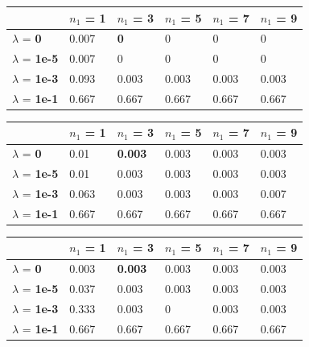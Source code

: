\documentclass[10pt]{article}
\begin{document}
\begin{table}
\centering
\begin{tabular}{llllll}
\toprule
& $n_1$ = \bf{1} & $n_1$ =  \bf{3} & $n_1$ =  \bf{5} & $n_1$ =  \bf{7} & $n_1$ =  \bf{9} \\
\midrule
$\lambda$ = \bf{0} &  0.007 & \bf{0}     & 0     & 0     & 0     \\
$\lambda$ = \bf{1e-5} & 0.007 & 0     & 0     & 0     & 0     \\
$\lambda$ = \bf{1e-3} & 0.093 & 0.003 & 0.003 & 0.003 & 0.003 \\
$\lambda$ = \bf{1e-1} & 0.667 & 0.667 & 0.667 & 0.667 & 0.667 \\
\bottomrule
\end{tabular}
\end{table}

\begin{table}
\centering
\begin{tabular}{llllll}
\toprule
& $n_1$ = \bf{1} & $n_1$ =  \bf{3} & $n_1$ =  \bf{5} & $n_1$ =  \bf{7} & $n_1$ =  \bf{9} \\
\midrule
$\lambda$ = \bf{0} &      0.01  & \bf{0.003} & 0.003 & 0.003 & 0.003 \\
$\lambda$ = \bf{1e-5} &  0.01  & 0.003 & 0.003 & 0.003 & 0.003 \\
$\lambda$ = \bf{1e-3} &  0.063 & 0.003 & 0.003 & 0.003 & 0.007 \\
$\lambda$ = \bf{1e-1} &  0.667 & 0.667 & 0.667 & 0.667 & 0.667 \\
\bottomrule
\end{tabular}
\end{table}

\begin{table}
\centering
\begin{tabular}{llllll}
\toprule
& $n_1$ = \bf{1} & $n_1$ =  \bf{3} & $n_1$ =  \bf{5} & $n_1$ =  \bf{7} & $n_1$ =  \bf{9} \\
\midrule
$\lambda$ = \bf{0} &       0.003 & \bf{0.003} & 0.003 & 0.003 & 0.003 \\
$\lambda$ = \bf{1e-5} &   0.037 & 0.003 & 0.003 & 0.003 & 0.003 \\
$\lambda$ = \bf{1e-3} &   0.333 & 0.003 & 0     & 0.003 & 0.003 \\
$\lambda$ = \bf{1e-1} &   0.667 & 0.667 & 0.667 & 0.667 & 0.667 \\
\bottomrule
\end{tabular}
\end{table}
	
\end{document}
